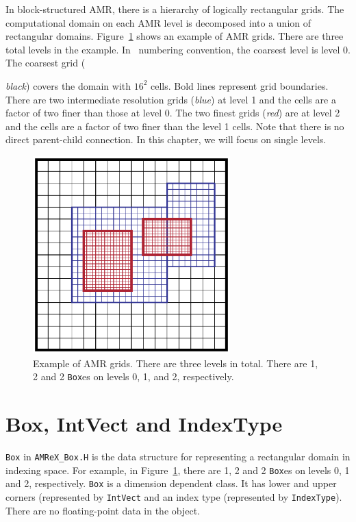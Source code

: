 In block-structured AMR, there is a hierarchy of logically rectangular
grids.  The computational domain on each AMR level is decomposed into
a union of rectangular domains.  Figure~\ref{fig:basics:amrgrids}
shows an example of AMR grids.  There are three total levels in the
example.  In \amrex\ numbering convention, the coarsest level is level
0.  The coarsest grid ({\emph{black}) covers the domain with $16^2$
cells. Bold lines represent grid boundaries.  There are two
intermediate resolution grids ({\emph{blue}}) at level 1 and the
cells are a factor of two finer than those at level 0.  The two finest
grids ({\emph{red}}) are at level 2 and the cells are a factor of two
finer than the level 1 cells.  Note that there is no direct
parent-child connection.  In this chapter, we will focus on single
levels.

\begin{figure}
  \centering
  \includegraphics[width=3in]{./Basics/amrgrids.pdf}
  \caption{\label{fig:basics:amrgrids} Example of AMR grids.  There are
    three levels in total.  There are 1, 2 and 2 {\tt Box}es on levels
  0, 1, and 2, respectively.}
\end{figure}

\section{Box, IntVect and IndexType}
\label{sec:basics:box}

{\tt Box} in {\tt AMReX\_Box.H} is the data structure for representing
a rectangular domain in indexing space.  For example, in
Figure~\ref{fig:basics:amrgrids}, there are 1, 2 and 2 {\tt Box}es on
levels 0, 1 and 2, respectively.  {\tt Box} is a dimension dependent
class.  It has lower and upper corners (represented by {\tt IntVect}
and an index type (represented by {\tt IndexType}).  There are no
floating-point data in the object.

}
